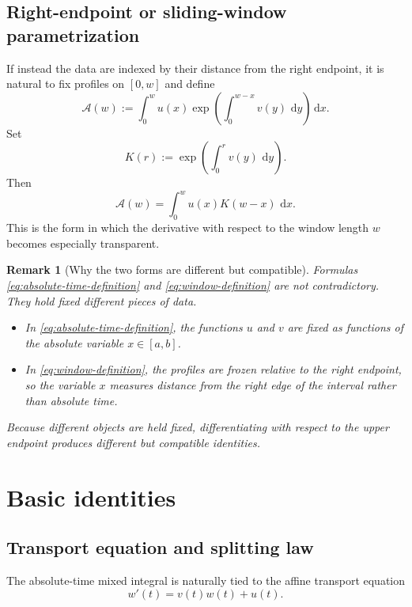 \documentclass[11pt]{article}
\newtheorem{remark}{Remark}
\newcommand{\dd}{\,\mathrm{d}}
\begin{document}
\subsection{Right-endpoint or sliding-window parametrization}

If instead the data are indexed by their distance from the right endpoint, it is natural to fix profiles on $[0,w]$ and define
\begin{equation}
\label{eq:window-definition}
\mathcal{A}(w)
:=
\int_0^w u(x)\exp\!\left(\int_0^{w-x} v(y)\,\dd y\right)\dd x.
\end{equation}
Set
\[
K(r):=\exp\!\left(\int_0^r v(y)\,\dd y\right).
\]
Then
\begin{equation}
\label{eq:window-convolution}
\mathcal{A}(w)=\int_0^w u(x)K(w-x)\,\dd x.
\end{equation}
This is the form in which the derivative with respect to the window length $w$ becomes especially transparent.

\begin{remark}[Why the two forms are different but compatible]
Formulas \eqref{eq:absolute-time-definition} and \eqref{eq:window-definition} are not contradictory. They hold fixed different pieces of data.
\begin{itemize}[leftmargin=1.5em]
\item In \eqref{eq:absolute-time-definition}, the functions $u$ and $v$ are fixed as functions of the absolute variable $x\in[a,b]$.
\item In \eqref{eq:window-definition}, the profiles are frozen relative to the right endpoint, so the variable $x$ measures distance from the right edge of the interval rather than absolute time.
\end{itemize}
Because different objects are held fixed, differentiating with respect to the upper endpoint produces different but compatible identities.
\end{remark}

\section{Basic identities}

\subsection{Transport equation and splitting law}

The absolute-time mixed integral is naturally tied to the affine transport equation
\begin{equation}
\label{eq:transport}
w'(t)=v(t)w(t)+u(t).
\end{equation}
\end{document}
